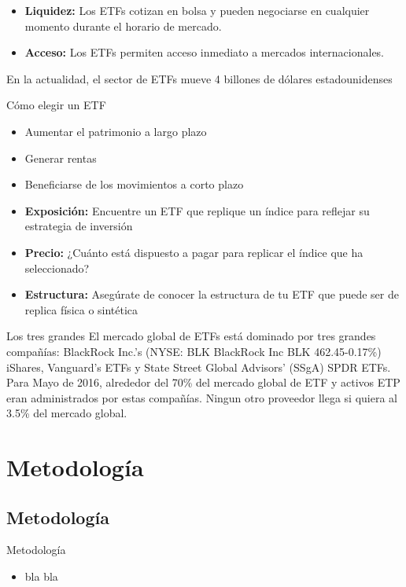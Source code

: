\documentclass{beamer}
\begin{document}
\begin{frame}
\begin{itemize}
\item \textbf{Liquidez:} Los ETFs cotizan en bolsa y pueden negociarse en cualquier momento durante el horario de mercado.
\item \textbf{Acceso:} Los ETFs permiten acceso inmediato a mercados internacionales.
\end{itemize}
\justify 
En la actualidad, el sector de ETFs mueve 4 billones de dólares estadounidenses
\end{frame}


\begin{frame}{Cómo elegir un ETF}
\begin{itemize}
\item Aumentar el patrimonio a largo plazo
\item Generar rentas
\item Beneficiarse de los movimientos a corto plazo
\item \textbf{Exposición:} Encuentre un ETF que replique un índice para reflejar su estrategia de inversión
\item \textbf{Precio:} ¿Cuánto está dispuesto a pagar para replicar el índice que ha seleccionado?
\item \textbf{Estructura:} Asegúrate de conocer la estructura de tu ETF que puede ser de replica física o sintética
\end{itemize}
\end{frame}

\begin{frame}{Los tres grandes}
\justify 
El mercado global de ETFs está dominado por tres grandes compañías: BlackRock Inc.'s (NYSE: BLK
BlackRock Inc BLK 462.45-0.17\%) iShares, Vanguard's ETFs y State Street Global Advisors’ (SSgA) SPDR ETFs. Para Mayo de 2016, alrededor del 70\% del mercado global de ETF y activos ETP eran administrados por estas compañías. Ningun otro proveedor llega si quiera al 3.5\% del mercado global. 
\end{frame}

\section{Metodología}

\subsection{Metodología}

\begin{frame}{Metodología}

\begin{itemize}
\item bla bla
\end{itemize}

\end{frame}
\end{document}
